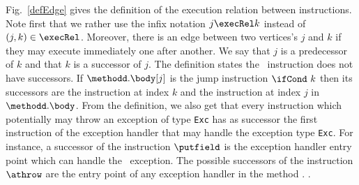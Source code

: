  Fig.\ \ref{defEdge} gives the definition of  the execution relation between instructions.
Note first that we rather use the infix notation $j \execRel k$ instead of $(j, k) \in \execRel$.
 Moreover, there is an edge between two vertices's $j$ and  $k$ if they may execute immediately one after another.
 We say that $j$ is a predecessor of $k$ and that  $k$ is a successor of  $j$.
 The definition states the \return \  instruction  does not have successors.
If  $\methodd.\body[j ]$ is the jump instruction $ \ifCond \ k $ then  its successors are the instruction at index $k$   and the instruction at index $j$ in $\methodd.\body$.
From the definition, we also get that every instruction which potentially may throw an exception of type \texttt{Exc}
has as successor the first instruction of the exception handler that may handle the exception type \texttt{Exc}. For instance, a successor
of the instruction $\putfield$ is the exception handler entry point which can handle  the \NullPointerExc \ exception. 
The possible successors of the instruction $\athrow$ are the entry point of any  exception handler  in the method \methodd.
.

